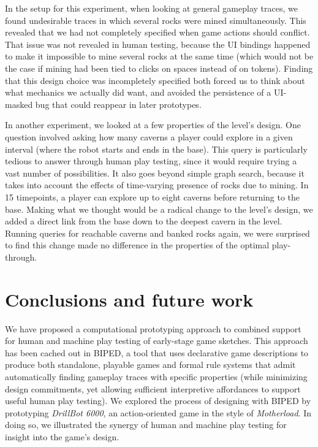 \documentclass[letterpaper]{article}
\begin{document}
In the setup for this experiment, when looking at general gameplay traces, we
found undesirable traces in which several rocks were mined simultaneously.
This revealed that we had not completely specified when game actions
should conflict. That issue was not revealed in human testing,
because the UI bindings happened to make it impossible to mine several rocks at
the same time (which would not be the case if mining had been tied to clicks on
spaces instead of on tokens). Finding that this design choice was incompletely
specified both forced us to think about what mechanics we actually did want,
and avoided the persistence of a UI-masked bug that could reappear
in later prototypes.

In another experiment, we looked at a few properties of the level's design.
One question involved asking how many caverns a player could explore in a
given interval (where the robot starts and ends in the base). This query is
particularly tedious to answer through human play testing, since it would
require trying a vast number of possibilities. It also goes beyond simple graph
search, because it takes into account the effects of time-varying presence of
rocks due to mining. In 15 timepoints, a player can explore up to eight caverns
before returning to the base. Making what we thought would be a radical change
to the level's design, we added a direct link from the base down to the deepest
cavern in the level. Running queries for reachable caverns and banked rocks
again, we were surprised to find this change made no difference in the
properties of the optimal play-through.

\section{Conclusions and future work}

We have proposed a computational prototyping approach to combined support for
human and machine play testing of early-stage game sketches. This approach has
been cached out in BIPED, a tool that uses declarative game descriptions to
produce both standalone, playable games and formal rule systems that admit
automatically finding gameplay traces with specific properties (while
minimizing design commitments, yet allowing sufficient interpretive affordances
to support useful human play testing). We explored the process of designing with BIPED
by prototyping \emph{DrillBot 6000}, an action-oriented game in the style of
\emph{Motherload}. In doing so, we illustrated the
synergy of human and machine play testing for insight into the game's
design.
\end{document}
